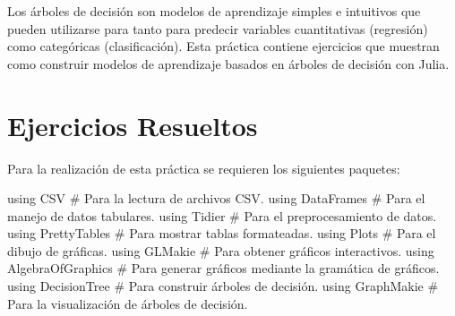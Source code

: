 \documentclass[
  a4paper,
]{scrreport}
\newenvironment{Shaded}{\begin{snugshade}}{\end{snugshade}}
\newcommand{\BuiltInTok}[1]{\textcolor[rgb]{0.00,0.23,0.31}{#1}}
\newcommand{\CommentTok}[1]{\textcolor[rgb]{0.37,0.37,0.37}{#1}}
\newcommand{\ImportTok}[1]{\textcolor[rgb]{0.00,0.46,0.62}{#1}}
\theoremstyle{definition}
\theoremstyle{remark}
\begin{document}
Los árboles de decisión son modelos de aprendizaje simples e intuitivos
que pueden utilizarse para tanto para predecir variables cuantitativas
(regresión) como categóricas (clasificación). Esta práctica contiene
ejercicios que muestran como construir modelos de aprendizaje basados en
árboles de decisión con Julia.

\section{Ejercicios Resueltos}\label{ejercicios-resueltos-2}

Para la realización de esta práctica se requieren los siguientes
paquetes:

\begin{Shaded}
\begin{Highlighting}[]
\ImportTok{using} \BuiltInTok{CSV}  \CommentTok{\# Para la lectura de archivos CSV.}
\ImportTok{using} \BuiltInTok{DataFrames}  \CommentTok{\# Para el manejo de datos tabulares.}
\ImportTok{using} \BuiltInTok{Tidier} \CommentTok{\# Para el preprocesamiento de datos.}
\ImportTok{using} \BuiltInTok{PrettyTables}  \CommentTok{\# Para mostrar tablas formateadas.}
\ImportTok{using} \BuiltInTok{Plots}  \CommentTok{\# Para el dibujo de gráficas.}
\ImportTok{using} \BuiltInTok{GLMakie}  \CommentTok{\# Para obtener gráficos interactivos.}
\ImportTok{using} \BuiltInTok{AlgebraOfGraphics} \CommentTok{\# Para generar gráficos mediante la gramática de gráficos.}
\ImportTok{using} \BuiltInTok{DecisionTree} \CommentTok{\# Para construir árboles de decisión.}
\ImportTok{using} \BuiltInTok{GraphMakie} \CommentTok{\# Para la visualización de árboles de decisión.}
\end{Highlighting}
\end{Shaded}
\end{document}
